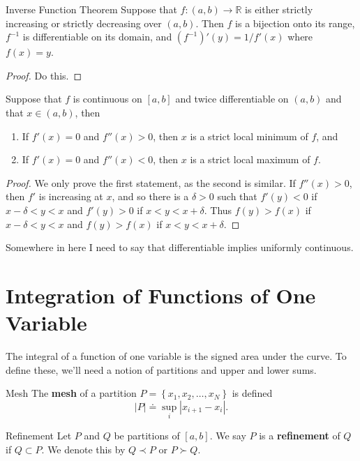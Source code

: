 \documentclass[10pt]{report}
\begin{document}
\begin{thrm}{Inverse Function Theorem}{}
	Suppose that $f:(a,b) \to \mathbb{R}$ is either strictly increasing or strictly decreasing over $(a,b)$. Then $f$ is a bijection onto its range, $f^{-1}$ is differentiable on its domain, and $(f^{-1})'(y) = 1/f'(x)$ where $f(x) = y$.
\end{thrm}
\begin{proof}
	{\color{red}Do this.}
\end{proof}

\begin{prop}
	Suppose that $f$ is continuous on $[a,b]$ and twice differentiable on $(a,b)$ and that $x \in (a,b)$, then
	\begin{enumerate}
		\item If $f'(x) = 0$ and $f''(x) > 0$, then $x$ is a strict local minimum of $f$, and
		\item If $f'(x) = 0$ and $f''(x) < 0$, then $x$ is a strict local maximum of $f$.
	\end{enumerate}
\end{prop}
\begin{proof}
	We only prove the first statement, as the second is similar. If $f''(x) > 0$, then $f'$ is increasing at $x$, and so there is a $\delta>0$ such that $f'(y) < 0$ if $x-\delta<y<x$ and $f'(y) > 0$ if $x<y<x+\delta$. Thus  $f(y) > f(x)$ if $x-\delta<y<x$ and $f(y)>f(x)$ if $x<y<x+\delta$.
\end{proof}

{\color{red}Somewhere in here I need to say that differentiable implies uniformly continuous.}


\section{Integration of Functions of One Variable}

The integral of a function of one variable is the signed area under the curve. To define these, we'll need a notion of partitions and upper and lower sums.

\begin{defn}{Mesh}{}
The \textbf{mesh} of a partition $P =\left\{ x_1,x_2,\dots,x_N \right\}$ is defined
\[
	|P| \doteq \sup_i |x_{i+1}-x_i|.
\] 
\end{defn}

\begin{defn}{Refinement}{}
	Let $P$ and $Q$ be partitions of $[a,b]$. We say $P$ is a \textbf{refinement} of $Q$ if $Q \subset P$. We denote this by $Q \prec P$ or $P \succ Q$.
\end{defn}
\end{document}
